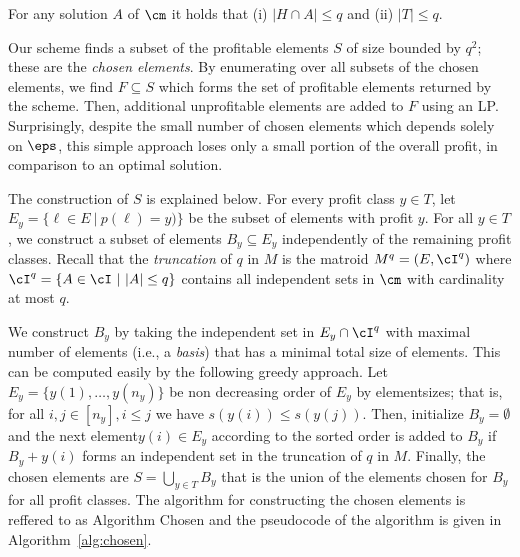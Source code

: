 \begin{lemma}
	\label{q}
	For any solution $A$ of $\cm$ it holds that (i) $|H \cap A| \leq q$ and (ii) $|T| \leq q$. 
\end{lemma}



Our scheme finds a subset of the profitable elements $S$ of size bounded by $q^2$; these are the {\em chosen elements}. By enumerating over all subsets of the chosen elements,  we find $F \subseteq S$ which forms the set of profitable elements returned by the scheme. Then, additional unprofitable elements are added to $F$ using an LP. Surprisingly, despite the small number of chosen elements which depends solely on $\eps$, this simple approach loses only a small portion of the overall profit, in comparison to an optimal solution. 




The construction of $S$ is explained below.  For every profit class $y \in T$, let $E_y = \{\ell \in E~|~p(\ell) = y)\}$ be the subset of elements with profit $y$. For all $y \in T$, we construct a subset of elements $B_y \subseteq E_y$ independently of the remaining profit classes. Recall that the {\em truncation} of $q$ in $M$ is the matroid $M^q = (E,\cI^q)$ where $\cI^q = \{A \in \cI~|~ |A| \leq q\}$ contains all independent sets in $\cm$ with cardinality at most $q$. 

We construct $B_y$ by taking the independent set in $E_y \cap \cI^q$ with maximal number of elements (i.e., a {\em basis}) that has a minimal total size of elements. This can be computed easily by the following greedy approach. Let $E_y  = \{y(1), \ldots, y(n_y)\}$ be non decreasing order of $E_y$ by elementsizes; that is, for all $i,j \in [n_y], i \leq j$ we have $s\left(y(i)\right) \leq s\left(y(j)\right)$. Then, initialize $B_y = \emptyset$ and the next element$y(i) \in E_y$ according to the sorted order is added to $B_y$ if $B_y+y(i)$ forms an independent set in the truncation of $q$ in $M$. Finally, the chosen elements are $S = \bigcup_{y \in T} B_y$ that is the union of the elements chosen for $B_y$ for all profit classes. The algorithm for constructing the chosen elements is reffered to as Algorithm \textsf{Chosen} and the pseudocode of the algorithm is given in Algorithm~\ref{alg:chosen}. 



